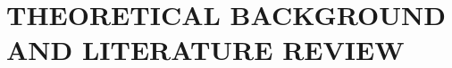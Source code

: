 \documentclass[12pt]{report}
\begin{document}
\onehalfspacing


\pagestyle{plain}







% 



\newpage
\newcommand{\centerlistoffigures}{
\begin{center}
    \bfseries
    \fontsize{16}{18}\selectfont
    LIST OF FIGURES
\end{center}
}

\renewcommand{\listfigurename}{\centerlistoffigures} %

\listoffigures


\newpage
\tableofcontents
\thispagestyle{empty}


\newpage
\setcounter{page}{1}
\setlength{\parskip}{6.5pt}

% 
\newpage

\chapter{THEORETICAL BACKGROUND AND LITERATURE REVIEW}





\newpage


\newpage




\newpage
\renewcommand{\bibname}{REFERENCES}




\end{document}
